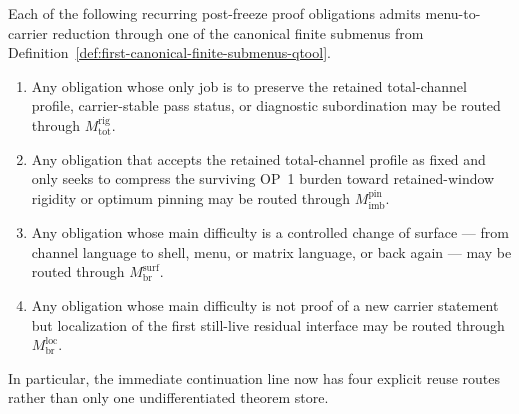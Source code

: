\begin{proposition}
\label{prop:first-certified-submenu-reduction-routes}
Each of the following recurring post-freeze proof obligations admits menu-to-carrier reduction through one of the canonical finite submenus from Definition~\ref{def:first-canonical-finite-submenus-qtool}.
\begin{enumerate}[leftmargin=2em]
  \item Any obligation whose only job is to preserve the retained total-channel profile, carrier-stable pass status, or diagnostic subordination may be routed through \(M^{\mathrm{rig}}_{\mathrm{tot}}\).

  \item Any obligation that accepts the retained total-channel profile as fixed and only seeks to compress the surviving OP~1 burden toward retained-window rigidity or optimum pinning may be routed through \(M^{\mathrm{pin}}_{\mathrm{imb}}\).

  \item Any obligation whose main difficulty is a controlled change of surface --- from channel language to shell, menu, or matrix language, or back again --- may be routed through \(M^{\mathrm{surf}}_{\mathrm{br}}\).

  \item Any obligation whose main difficulty is not proof of a new carrier statement but localization of the first still-live residual interface may be routed through \(M^{\mathrm{loc}}_{\mathrm{br}}\).
\end{enumerate}
In particular, the immediate continuation line now has four explicit reuse routes rather than only one undifferentiated theorem store.
\end{proposition}

